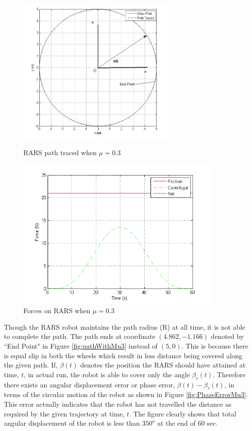 \begin{figure}
	\begin{minipage}[t]{0.5\textwidth}
		\centering
		\includegraphics[height=2.9in,keepaspectratio]{Chapter4/fig/PathWithMu-3slip}
		\caption{RARS path traced when $\mu=0.3$}\label{fig:pathWithMu3}
	\end{minipage}
	\hfill
	\begin{minipage}[t]{0.5\textwidth}
		\centering
		\includegraphics[height=3in,width=\textwidth]{Chapter4/fig/ForceMu-3}
		\caption{Forces on RARS when $\mu=0.3$ }\label{fig:ForcesMu3}
	\end{minipage}
\end{figure}

Though the RARS robot maintains the path radius (R) at all time, it is not able to complete the path. The path ends at coordinate  ${(4.862,-1.166)}$ denoted by ``End Point" in  Figure \ref{fig:pathWithMu3} instead of  ${(5,0)}$. This is because  there is equal  slip in both the wheels which result in less distance being  covered along the given path.    If, $\beta(t)$ denotes the position the RARS should have attained at time, $t$, in actual run, the robot is able to cover only the angle $\beta_r(t)$. Therefore there exists an angular displacement error or  phase error, $\beta(t)-\beta_r(t)$, in terms of the circular motion of the robot as shown in Figure \ref{fig:PhazeErrorMu3}. This error actually indicates that the robot has not travelled the distance as required by the given trajectory at time, $t$. The figure clearly shows that total angular displacement of the robot is less than $350^o$ at the end of 60 sec.


